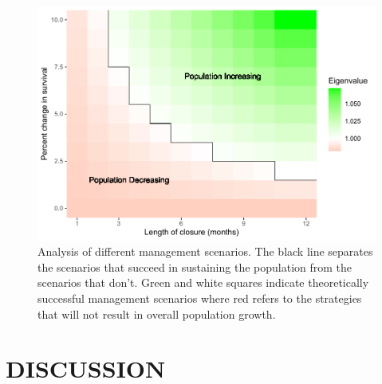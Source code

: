 \documentclass[
]{article}
\begin{document}
\begin{figure}
\centering
\includegraphics{Wulfing_OCyaneaSubmission_files/figure-latex/closures-1.pdf}
\caption{\label{fig:closures}Analysis of different management scenarios. The black line separates the scenarios that succeed in sustaining the population from the scenarios that don't. Green and white squares indicate theoretically successful management scenarios where red refers to the strategies that will not result in overall population growth. \label{closures}}
\end{figure}

\hypertarget{discussion}{%
\section{DISCUSSION}\label{discussion}}
\end{document}
